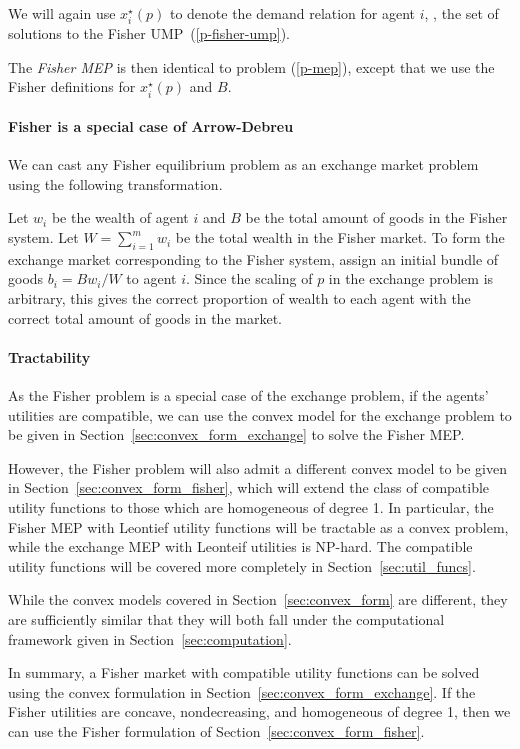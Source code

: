 \documentclass[12pt]{article}
\begin{document}
We will again use $x^\star_i(p)$ to denote the demand relation
for agent $i$, \ie, the set of solutions to the Fisher UMP~(\ref{p-fisher-ump}).

The \emph{Fisher MEP} is then identical to problem (\ref{p-mep}), except that we use 
the Fisher definitions for $x^\star_i(p)$ and $B$.

\paragraph{Fisher is a special case of Arrow-Debreu}
We can cast any Fisher equilibrium problem as an exchange market problem using the following transformation.

Let $w_i$ be the wealth of agent $i$ and $B$ be the total amount of goods in
the Fisher system.
Let $W = \sum_{i=1}^m w_i$ be the total wealth in the Fisher market.
To form the exchange market corresponding to the Fisher system, assign an initial bundle of goods
$b_i = B w_i/W$ to agent $i$.
Since the scaling of $p$ in the exchange problem is arbitrary,
this gives the correct proportion of wealth to each agent with the correct
total amount of goods in the market.


\paragraph{Tractability}
As the Fisher problem is a special case of the exchange problem,
if the agents' utilities are compatible, we can use the convex model for the
exchange problem
to be given in Section~\ref{sec:convex_form_exchange} to solve
the Fisher MEP.

However, the Fisher problem will also admit a different
convex model to be given in Section~\ref{sec:convex_form_fisher},
which will extend the class of compatible utility functions
to those which are homogeneous of degree 1.
In particular, the Fisher MEP with Leontief utility functions
will be tractable as a convex problem, while the exchange MEP
with Leonteif utilities is NP-hard.
The compatible utility functions will be covered more completely
in Section~\ref{sec:util_funcs}.

While the convex models covered in Section~\ref{sec:convex_form} are different,
they are sufficiently similar that they will both fall under the computational
framework given in Section~\ref{sec:computation}.

In summary, a Fisher market with compatible utility functions can be solved
using the convex formulation in Section~\ref{sec:convex_form_exchange}.
If the Fisher utilities are concave, nondecreasing, and homogeneous
of degree 1, then we can use the Fisher formulation of Section~\ref{sec:convex_form_fisher}.
\end{document}
